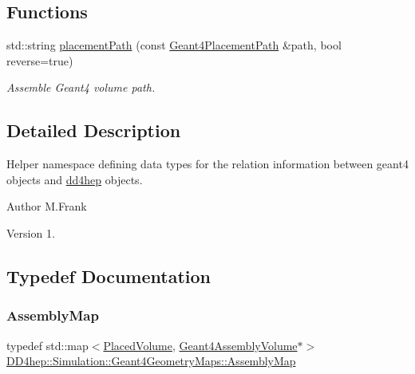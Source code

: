 \subsection*{Functions}
\begin{DoxyCompactItemize}
\item 
std\+::string \hyperlink{namespace_d_d4hep_1_1_simulation_1_1_geant4_geometry_maps_af627f19c95eb3ca249c7464078af28dc}{placement\+Path} (const \hyperlink{namespace_d_d4hep_1_1_simulation_1_1_geant4_geometry_maps_a8a325934adb143cb1cbc47dd030395ed}{Geant4\+Placement\+Path} \&path, bool reverse=true)
\begin{DoxyCompactList}\small\item\em Assemble Geant4 volume path. \end{DoxyCompactList}\end{DoxyCompactItemize}


\subsection{Detailed Description}
Helper namespace defining data types for the relation information between geant4 objects and \hyperlink{namespacedd4hep}{dd4hep} objects. 

\begin{DoxyAuthor}{Author}
M.\+Frank 
\end{DoxyAuthor}
\begin{DoxyVersion}{Version}
1. 
\end{DoxyVersion}


\subsection{Typedef Documentation}
\hypertarget{namespace_d_d4hep_1_1_simulation_1_1_geant4_geometry_maps_ae1f67e315dd299b17e4ea1c58a47b312}{}\label{namespace_d_d4hep_1_1_simulation_1_1_geant4_geometry_maps_ae1f67e315dd299b17e4ea1c58a47b312} 
\subsubsection{\texorpdfstring{Assembly\+Map}{AssemblyMap}}
{\footnotesize\ttfamily typedef std\+::map$<$\hyperlink{class_d_d4hep_1_1_geometry_1_1_placed_volume}{Placed\+Volume}, \hyperlink{class_d_d4hep_1_1_simulation_1_1_geant4_assembly_volume}{Geant4\+Assembly\+Volume}$\ast$$>$ \hyperlink{namespace_d_d4hep_1_1_simulation_1_1_geant4_geometry_maps_ae1f67e315dd299b17e4ea1c58a47b312}{D\+D4hep\+::\+Simulation\+::\+Geant4\+Geometry\+Maps\+::\+Assembly\+Map}}



